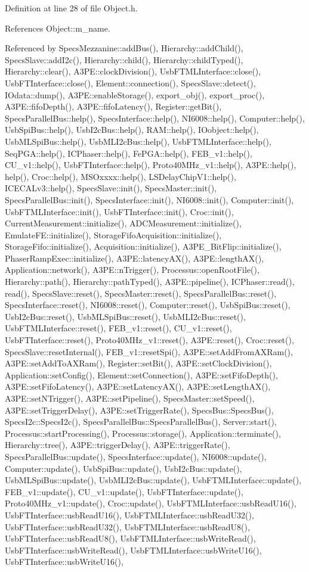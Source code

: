Definition at line 28 of file Object.h.

References Object::m\_\-name.

Referenced by SpecsMezzanine::addBus(), Hierarchy::addChild(), SpecsSlave::addI2c(), Hierarchy::child(), Hierarchy::childTyped(), Hierarchy::clear(), A3PE::clockDivision(), UsbFTMLInterface::close(), UsbFTInterface::close(), Element::connection(), SpecsSlave::detect(), IOdata::dump(), A3PE::enableStorage(), export\_\-obj(), export\_\-proc(), A3PE::fifoDepth(), A3PE::fifoLatency(), Register::getBit(), SpecsParallelBus::help(), SpecsInterface::help(), NI6008::help(), Computer::help(), UsbSpiBus::help(), UsbI2cBus::help(), RAM::help(), IOobject::help(), UsbMLSpiBus::help(), UsbMLI2cBus::help(), UsbFTMLInterface::help(), SeqPGA::help(), ICPhaser::help(), FePGA::help(), FEB\_\-v1::help(), CU\_\-v1::help(), UsbFTInterface::help(), Proto40MHz\_\-v1::help(), A3PE::help(), help(), Croc::help(), MSOxxxx::help(), LSDelayChipV1::help(), ICECALv3::help(), SpecsSlave::init(), SpecsMaster::init(), SpecsParallelBus::init(), SpecsInterface::init(), NI6008::init(), Computer::init(), UsbFTMLInterface::init(), UsbFTInterface::init(), Croc::init(), CurrentMeasurement::initialize(), ADCMeasurement::initialize(), EmulateFE::initialize(), StorageFifoAcquisition::initialize(), StorageFifo::initialize(), Acquisition::initialize(), A3PE\_\-BitFlip::initialize(), PhaserRampExec::initialize(), A3PE::latencyAX(), A3PE::lengthAX(), Application::network(), A3PE::nTrigger(), Processus::openRootFile(), Hierarchy::path(), Hierarchy::pathTyped(), A3PE::pipeline(), ICPhaser::read(), read(), SpecsSlave::reset(), SpecsMaster::reset(), SpecsParallelBus::reset(), SpecsInterface::reset(), NI6008::reset(), Computer::reset(), UsbSpiBus::reset(), UsbI2cBus::reset(), UsbMLSpiBus::reset(), UsbMLI2cBus::reset(), UsbFTMLInterface::reset(), FEB\_\-v1::reset(), CU\_\-v1::reset(), UsbFTInterface::reset(), Proto40MHz\_\-v1::reset(), A3PE::reset(), Croc::reset(), SpecsSlave::resetInternal(), FEB\_\-v1::resetSpi(), A3PE::setAddFromAXRam(), A3PE::setAddToAXRam(), Register::setBit(), A3PE::setClockDivision(), Application::setConfig(), Element::setConnection(), A3PE::setFifoDepth(), A3PE::setFifoLatency(), A3PE::setLatencyAX(), A3PE::setLengthAX(), A3PE::setNTrigger(), A3PE::setPipeline(), SpecsMaster::setSpeed(), A3PE::setTriggerDelay(), A3PE::setTriggerRate(), SpecsBus::SpecsBus(), SpecsI2c::SpecsI2c(), SpecsParallelBus::SpecsParallelBus(), Server::start(), Processus::startProcessing(), Processus::storage(), Application::terminate(), Hierarchy::tree(), A3PE::triggerDelay(), A3PE::triggerRate(), SpecsParallelBus::update(), SpecsInterface::update(), NI6008::update(), Computer::update(), UsbSpiBus::update(), UsbI2cBus::update(), UsbMLSpiBus::update(), UsbMLI2cBus::update(), UsbFTMLInterface::update(), FEB\_\-v1::update(), CU\_\-v1::update(), UsbFTInterface::update(), Proto40MHz\_\-v1::update(), Croc::update(), UsbFTMLInterface::usbReadU16(), UsbFTInterface::usbReadU16(), UsbFTMLInterface::usbReadU32(), UsbFTInterface::usbReadU32(), UsbFTMLInterface::usbReadU8(), UsbFTInterface::usbReadU8(), UsbFTMLInterface::usbWriteRead(), UsbFTInterface::usbWriteRead(), UsbFTMLInterface::usbWriteU16(), UsbFTInterface::usbWriteU16(), 